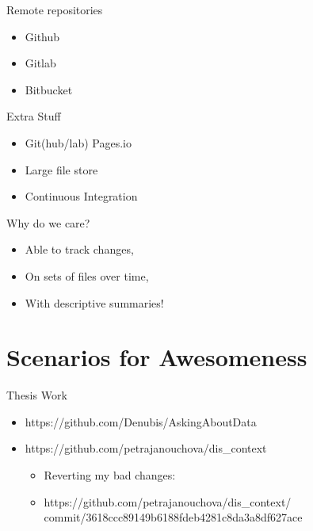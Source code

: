 \documentclass[aspectratio=1610]{beamer} %
\begin{document}
\begin{frame}{Remote repositories}
  
    \begin{itemize}
    \item Github
    \item Gitlab
    \item Bitbucket

  \end{itemize}
\end{frame}

\begin{frame}{Extra Stuff}
  
    \begin{itemize}
    \item Git(hub/lab) Pages.io
    \item Large file store
    \item Continuous Integration


  \end{itemize}
\end{frame}


\begin{frame}{Why do we care?}
  
    \begin{itemize}
    \item Able to track changes,  
    \item On sets of files over time,
    \item With descriptive summaries!

  \end{itemize}
\end{frame}

\section{Scenarios for Awesomeness}


\begin{frame}{Thesis Work}
  
  \begin{itemize}
    \item https://github.com/Denubis/AskingAboutData
    \item https://github.com/petrajanouchova/dis\_context
    \begin{itemize}
        \item Reverting my bad changes:
      \item https://github.com/petrajanouchova/dis\_context/\\commit/3618ccc89149b6188fdeb4281c8da3a8df627ace
    \end{itemize}
  \end{itemize}
\end{frame}
\end{document}
